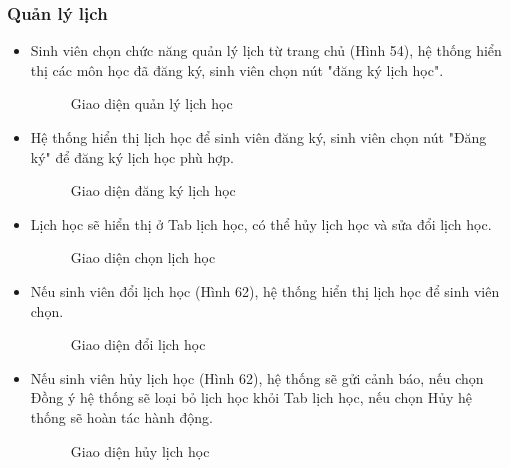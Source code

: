 \subsubsection*{Quản lý lịch}
\begin{itemize}
    \item Sinh viên chọn chức năng quản lý lịch từ trang chủ (Hình 54), hệ thống hiển thị các môn học đã đăng ký, sinh viên chọn nút "đăng ký lịch học". 
    \begin{figure}[H]
    \centering
    \setlength{\fboxsep}{2pt}     
    \setlength{\fboxrule}{0.5pt}   
    \caption{Giao diện quản lý lịch học}
    \end{figure}
    \item Hệ thống hiển thị lịch học để sinh viên đăng ký, sinh viên chọn nút "Đăng ký" để đăng ký lịch học phù hợp.
    \begin{figure}[H]
    \centering
    \setlength{\fboxsep}{2pt}     
    \setlength{\fboxrule}{0.5pt}   
    \caption{Giao diện đăng ký lịch học}
    \end{figure}
    \item Lịch học sẽ hiển thị ở Tab lịch học, có thể hủy lịch học và sửa đổi lịch học.
    \begin{figure}[H]
    \centering
    \setlength{\fboxsep}{2pt}     
    \setlength{\fboxrule}{0.5pt}   
    \caption{Giao diện chọn lịch học}
    \end{figure}
    \item Nếu sinh viên đổi lịch học (Hình 62), hệ thống hiển thị lịch học để sinh viên chọn.
    \begin{figure}[H]
    \centering
    \setlength{\fboxsep}{2pt}     
    \setlength{\fboxrule}{0.5pt}   
    \caption{Giao diện đổi lịch học}
    \end{figure}
    \item Nếu sinh viên hủy lịch học (Hình 62), hệ thống sẽ gửi cảnh báo, nếu chọn Đồng ý hệ thống sẽ loại bỏ lịch học khỏi Tab lịch học, nếu chọn Hủy hệ thống sẽ hoàn tác hành động.
    \begin{figure}[H]
    \centering
    \setlength{\fboxsep}{2pt}     
    \setlength{\fboxrule}{0.5pt}   
    \caption{Giao diện hủy lịch học}
    \end{figure}
\end{itemize}

